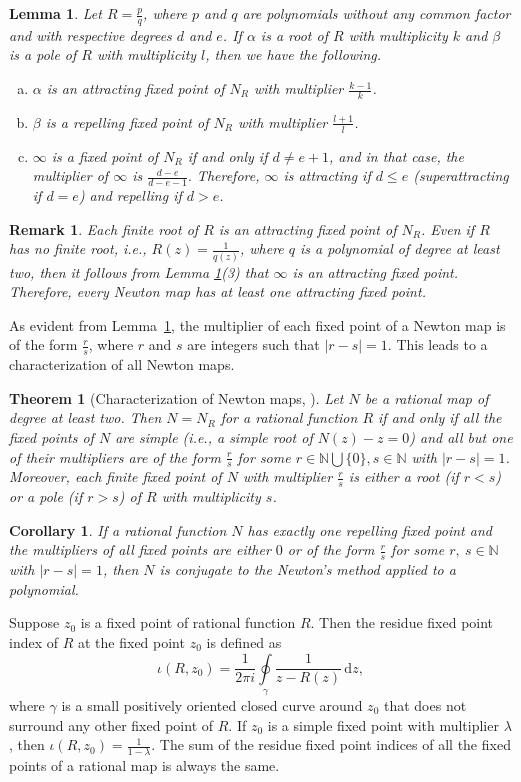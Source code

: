 \documentclass[12pt]{article}
\newtheorem{thm}{Theorem}[section]
\newtheorem{cor}{Corollary}[section]
\newtheorem{lem}{Lemma}[section]
\newtheorem{rem}{Remark}[section]
\numberwithin{equation}{section}
\begin{document}
\begin{lem}\label{NFP}
Let $R=\frac{p}{q}$, where $p$ and $q$ are polynomials without any common factor and with respective degrees $d$ and $e$. If $\alpha$  is a root of $R$ with multiplicity $k$ and $\beta$ is a pole of $R$ with multiplicity $l$, then we have the following.
	\begin{enumerate}[(a)]
		\item $\alpha$ is an attracting fixed point of $N_R$ with multiplier $\frac{k-1}{k}$.
		\item $\beta$ is a repelling fixed point of $N_R$ with multiplier $\frac{l+1}{l} $.
		\item $\infty$ is a fixed point of $N_R$ if and only if $d\neq e+1$, and in that case, the multiplier of $\infty$ is $ \frac{d-e}{d-e-1}. $ Therefore, $\infty$ is attracting if $d \leq e$ (superattracting if $d=e$) and repelling if $d>e$.
	\end{enumerate}
\end{lem}
\begin{rem}\label{Atlst_attracting}
 Each finite root of $R$ is an attracting fixed point of $N_R$. Even if $R$ has no finite root, i.e., $R(z)=\frac{1}{q(z)}$, where $q$ is a polynomial of degree at least two, then it follows from Lemma \ref{NFP}(3) that $\infty$ is an attracting fixed point. Therefore, every Newton map has at least one attracting fixed point.
\end{rem}
As evident from Lemma~\ref{NFP}, the multiplier of each fixed point of a Newton map is of the form $\frac{r}{s}$, where $r$ and $s$ are integers such that $|r-s|=1$. This leads to a characterization of all Newton maps.
\begin{thm}[Characterization of Newton maps, \cite{Nayak_Pal2022}]\label{Characterization_N_R}
	Let $N$ be a rational map of degree at least two. Then $N=N_R$ for a rational function $R$ if and only if all the fixed points of $N$ are simple (i.e., a simple root of $N(z)-z=0$) and all but one of their multipliers are of the form $ \frac{r}{s} $ for some $r \in \mathbb{N} \bigcup \{0\}, s \in \mathbb{N}$ with $|r-s|=1$. Moreover, each finite fixed point of $N$ with multiplier $\frac{r}{s}$ is either a root (if $r < s$) or a pole (if $r> s$) of $R$ with multiplicity $s$.
\end{thm}
\begin{cor}\label{Characterization_poly}
	If a rational function $N$ has exactly one repelling fixed point and the multipliers of all fixed points are either $0$ or of the form $\frac{r}{s}$ for some $r,~s \in \mathbb{N}$ with $|r-s|=1$, then $N$ is conjugate to the Newton's method applied to a polynomial.
\end{cor}
Suppose $z_0$ is a fixed point of rational function $R$. Then the residue fixed point index of $R$ at the fixed point $z_0$ is defined as 
$$
    \iota (R,z_0)= \frac{1}{2 \pi i} {\oint\limits_{\gamma}\frac{1}{z-R(z)}\,\mathrm{d}z},
$$
where $\gamma$ is a small positively oriented closed curve around $z_0$ that does not surround any other fixed point of $R$. If $z_0$ is a simple fixed point with multiplier $\lambda$, then $\iota (R,z_0)=\frac{1}{1-\lambda}$. The sum of the residue fixed point indices of all the fixed points of a rational map is always the same.
\end{document}
